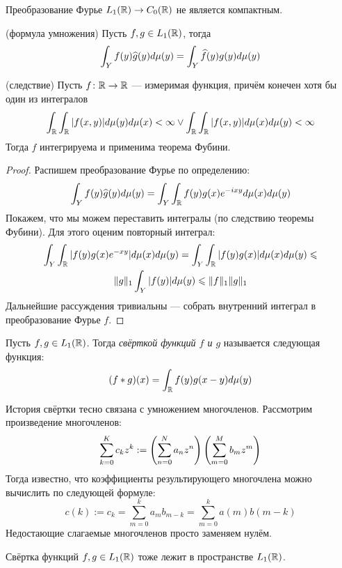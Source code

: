 \begin{exercise}
	Преобразование Фурье $L_1(\mathbb{R}) \to C_0(\mathbb{R})$ не является компактным.
\end{exercise}

\begin{proposition} (формула умножения)
	Пусть $f, g \in L_1(\mathbb{R})$, тогда
	\[
		\int_Y f(y)\widehat{g}(y)d\mu(y) = \int_Y \widehat{f}(y)g(y)d\mu(y)
	\]
\end{proposition}

\begin{reminder} (следствие)
	Пусть $f \colon \mathbb{R} \to \mathbb{R}$ --- измеримая функция, причём конечен хотя бы один из интегралов
	\[
		\int_{\mathbb{R}} \int_{\mathbb{R}} |f(x, y)|d\mu(y)d\mu(x) < \infty \vee \int_{\mathbb{R}} \int_{\mathbb{R}} |f(x, y)|d\mu(x)d\mu(y) < \infty
	\]
	Тогда $f$ интегрируема и применима теорема Фубини.
\end{reminder}

\begin{proof}
	Распишем преобразование Фурье по определению:
	\[
		\int_Y f(y)\widehat{g}(y)d\mu(y) = \int_Y \int_{\mathbb{R}} f(y)g(x)e^{-ixy}d\mu(x)d\mu(y)
	\]
	Покажем, что мы можем переставить интегралы (по следствию теоремы Фубини). Для этого оценим повторный интеграл:
	\begin{multline*}
		\int_Y \int_{\mathbb{R}} |f(y)g(x)e^{-xy}|d\mu(x)d\mu(y) = \int_Y \int_{\mathbb{R}} |f(y)g(x)|d\mu(x)d\mu(y) \leqslant
		\\
		\|g\|_1\int_Y |f(y)|d\mu(y) \leqslant \|f\|_1\|g\|_1
	\end{multline*}
	Дальнейшие рассуждения тривиальны --- собрать внутренний интеграл в преобразование Фурье $f$.
\end{proof}

\begin{definition}
	Пусть $f, g \in L_1(\mathbb{R})$. Тогда \textit{свёрткой функций $f$ и $g$} называется следующая функция:
	\[
		(f * g)(x) = \int_{\mathbb{R}} f(y)g(x - y)d\mu(y)
	\]
\end{definition}

\begin{note}
	История свёртки тесно связана с умножением многочленов. Рассмотрим произведение многочленов:
	\[
		\sum_{k = 0}^K c_kz^k := \left(\sum_{n = 0}^N a_nz^n\right)\left(\sum_{m = 0}^M b_mz^m\right)
	\]
	Тогда известно, что коэффициенты результирующего многочлена можно вычислить по следующей формуле:
	\[
		c(k) := c_k = \sum_{m = 0}^k a_mb_{m - k} = \sum_{m = 0}^k a(m)b(m - k)
	\]
	Недостающие слагаемые многочленов просто заменяем нулём.
\end{note}

\begin{proposition}
	Свёртка функций $f, g \in L_1(\mathbb{R})$ тоже лежит в пространстве $L_1(\mathbb{R})$.
\end{proposition}

